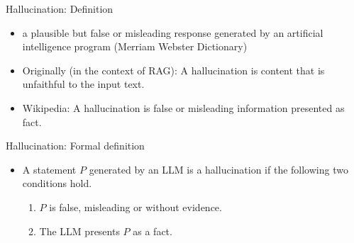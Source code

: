 \documentclass[11pt,compress,t,notes=noshow, xcolor=table]{beamer}
\def\myblue#1{\textcolor{texblue}{#1}}
\begin{document}
\begin{vbframe}{Hallucination: Definition}

\vfill


\begin{itemize}
\item 
  a plausible but false or misleading response generated
  by an artificial intelligence program (Merriam Webster Dictionary)
		\item Originally (in the context of RAG):
A hallucination is content that is unfaithful to the input text.
\href{https://aclanthology.org/2020.acl-main.173.pdf}{}
		\item
Wikipedia: A hallucination is false or misleading
		information presented as fact.
	\end{itemize}

\vfill

\end{vbframe}


\begin{vbframe}{Hallucination: Formal definition}

\vfill


	\begin{itemize}
		\item
A statement $P$ generated by an LLM is a hallucination if
the following two conditions hold.
\begin{enumerate}
    \item  $P$ is false, misleading or without evidence.
                    \item  The LLM presents $P$ as a fact.
	\end{enumerate}
	\end{itemize}

\vfill

\end{vbframe}
\end{document}
